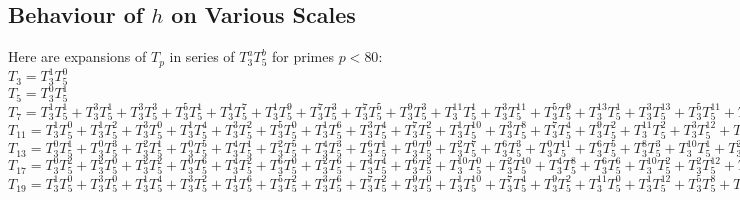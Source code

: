 \subsection{Behaviour of $h$ on Various Scales}
\label{expansionsOfTp}
Here are expansions of $T_p$ in series of $T_3^aT_5^b$ for primes $p<80$:\\
$T_{3} = T_3^{1}T_5^{0}$\\
$T_{5} = T_3^{0}T_5^{1}$\\
$T_{7} = T_3^{1}T_5^{1} + T_3^{3}T_5^{1} + T_3^{3}T_5^{3} + T_3^{5}T_5^{1} + T_3^{1}T_5^{7} + T_3^{1}T_5^{9} + T_3^{7}T_5^{3} + T_3^{7}T_5^{5} + T_3^{9}T_5^{3} + T_3^{11}T_5^{1} + T_3^{3}T_5^{11} + T_3^{5}T_5^{9} + T_3^{13}T_5^{1} + T_3^{3}T_5^{13} + T_3^{5}T_5^{11} + T_3^{9}T_5^{7} + T_3^{11}T_5^{5} + T_3^{13}T_5^{3} + T_3^{3}T_5^{15} + T_3^{7}T_5^{11} + T_3^{9}T_5^{9} + T_3^{13}T_5^{5} + T_3^{15}T_5^{3} + \dots $\\   
$T_{11} = T_3^{1}T_5^{0} + T_3^{1}T_5^{2} + T_3^{3}T_5^{0} + T_3^{1}T_5^{4} + T_3^{3}T_5^{2} + T_3^{5}T_5^{0} + T_3^{1}T_5^{6} + T_3^{3}T_5^{4} + T_3^{7}T_5^{2} + T_3^{1}T_5^{10} + T_3^{3}T_5^{8} + T_3^{7}T_5^{4} + T_3^{9}T_5^{2} + T_3^{11}T_5^{2} + T_3^{3}T_5^{12} + T_3^{5}T_5^{10} + T_3^{7}T_5^{8} + T_3^{11}T_5^{4} + T_3^{13}T_5^{2} + T_3^{9}T_5^{8} + T_3^{17}T_5^{0} + \dots $\\
$T_{13} = T_3^{0}T_5^{1} + T_3^{0}T_5^{3} + T_3^{2}T_5^{1} + T_3^{0}T_5^{5} + T_3^{4}T_5^{1} + T_3^{2}T_5^{5} + T_3^{4}T_5^{3} + T_3^{6}T_5^{1} + T_3^{0}T_5^{9} + T_3^{2}T_5^{7} + T_3^{6}T_5^{3} + T_3^{0}T_5^{11} + T_3^{6}T_5^{5} + T_3^{8}T_5^{3} + T_3^{10}T_5^{1} + T_3^{2}T_5^{11} + T_3^{4}T_5^{9} + T_3^{6}T_5^{7} + T_3^{10}T_5^{3} + T_3^{2}T_5^{13} + T_3^{4}T_5^{11} + T_3^{14}T_5^{1} + T_3^{2}T_5^{15} + T_3^{4}T_5^{13} + T_3^{6}T_5^{11} + T_3^{12}T_5^{5} + T_3^{16}T_5^{1} + \dots $\\
$T_{17} = T_3^{0}T_5^{2} + T_3^{2}T_5^{0} + T_3^{2}T_5^{2} + T_3^{0}T_5^{6} + T_3^{4}T_5^{2} + T_3^{6}T_5^{0} + T_3^{2}T_5^{6} + T_3^{4}T_5^{4} + T_3^{6}T_5^{2} + T_3^{10}T_5^{0} + T_3^{2}T_5^{10} + T_3^{4}T_5^{8} + T_3^{6}T_5^{6} + T_3^{10}T_5^{2} + T_3^{2}T_5^{12} + T_3^{6}T_5^{8} + T_3^{10}T_5^{4} + T_3^{2}T_5^{14} + T_3^{6}T_5^{10} + T_3^{8}T_5^{8} + T_3^{12}T_5^{4} + T_3^{14}T_5^{2} + T_3^{4}T_5^{14} + T_3^{8}T_5^{10} + T_3^{10}T_5^{8} + T_3^{12}T_5^{6} + T_3^{16}T_5^{2} + T_3^{18}T_5^{0} + \dots $\\
$T_{19} = T_3^{1}T_5^{0} + T_3^{3}T_5^{0} + T_3^{1}T_5^{4} + T_3^{3}T_5^{2} + T_3^{1}T_5^{6} + T_3^{5}T_5^{2} + T_3^{3}T_5^{6} + T_3^{7}T_5^{2} + T_3^{9}T_5^{0} + T_3^{1}T_5^{10} + T_3^{7}T_5^{4} + T_3^{9}T_5^{2} + T_3^{11}T_5^{0} + T_3^{1}T_5^{12} + T_3^{5}T_5^{8} + T_3^{11}T_5^{2} + T_3^{13}T_5^{0} + T_3^{3}T_5^{12} + T_3^{7}T_5^{8} + T_3^{9}T_5^{6} + T_3^{11}T_5^{4} + T_3^{13}T_5^{2} + T_3^{3}T_5^{14} + T_3^{7}T_5^{10} + T_3^{11}T_5^{6} + T_3^{15}T_5^{2} + T_3^{17}T_5^{0} + \dots $\\

